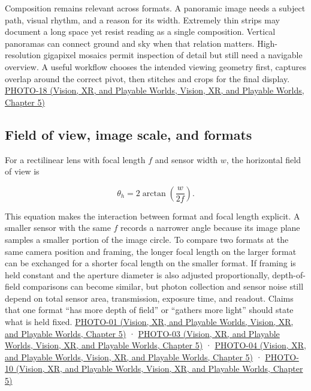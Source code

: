 Composition remains relevant across formats. A panoramic image needs a subject path, visual rhythm, and a reason for its width. Extremely thin strips may document a long space yet resist reading as a single composition. Vertical panoramas can connect ground and sky when that relation matters. High-resolution gigapixel mosaics permit inspection of detail but still need a navigable overview. A useful workflow chooses the intended viewing geometry first, captures overlap around the correct pivot, then stitches and crops for the final display. \href{../07-Vision-XR-and-Playable-Worlds/main.pdf\#nameddest=04-visual-computing-ii-ch036-photo-18---photography-session-18}{PHOTO-18 (Vision, XR, and Playable Worlds, Vision, XR, and Playable Worlds, Chapter 5)}

\subsection{Field of view, image scale, and formats}\label{03-visual-computing-i-ch003-field-of-view-image-scale-and-formats}

For a rectilinear lens with focal length \(f\) and sensor width \(w\), the horizontal field of view is

\[
\theta_h=2\arctan\left(\frac{w}{2f}\right).
\]

This equation makes the interaction between format and focal length explicit. A smaller sensor with the same \(f\) records a narrower angle because its image plane samples a smaller portion of the image circle. To compare two formats at the same camera position and framing, the longer focal length on the larger format can be exchanged for a shorter focal length on the smaller format. If framing is held constant and the aperture diameter is also adjusted proportionally, depth-of-field comparisons can become similar, but photon collection and sensor noise still depend on total sensor area, transmission, exposure time, and readout. Claims that one format ``has more depth of field'' or ``gathers more light'' should state what is held fixed. \href{../07-Vision-XR-and-Playable-Worlds/main.pdf\#nameddest=04-visual-computing-ii-ch036-photo-01---photography-session-01}{PHOTO-01 (Vision, XR, and Playable Worlds, Vision, XR, and Playable Worlds, Chapter 5)} · \href{../07-Vision-XR-and-Playable-Worlds/main.pdf\#nameddest=04-visual-computing-ii-ch036-photo-03---photography-session-03}{PHOTO-03 (Vision, XR, and Playable Worlds, Vision, XR, and Playable Worlds, Chapter 5)} · \href{../07-Vision-XR-and-Playable-Worlds/main.pdf\#nameddest=04-visual-computing-ii-ch036-photo-04---photography-session-04}{PHOTO-04 (Vision, XR, and Playable Worlds, Vision, XR, and Playable Worlds, Chapter 5)} · \href{../07-Vision-XR-and-Playable-Worlds/main.pdf\#nameddest=04-visual-computing-ii-ch036-photo-10---photography-session-10}{PHOTO-10 (Vision, XR, and Playable Worlds, Vision, XR, and Playable Worlds, Chapter 5)}

